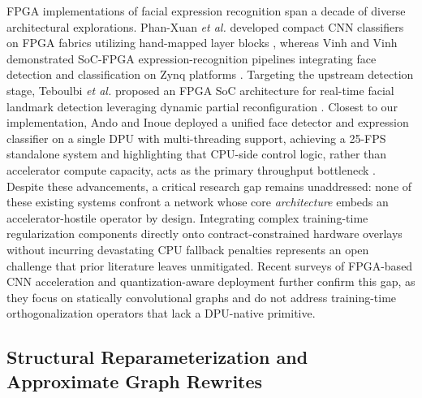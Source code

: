 \documentclass[algorithms,article,submit,moreauthors]{Definitions/mdpi}
\newcommand{\rev}[1]{\textcolor{revcolor}{#1}}
\begin{document}
FPGA implementations of facial expression recognition span a decade of diverse architectural explorations. Phan-Xuan \textit{et al.} developed compact CNN classifiers on FPGA fabrics utilizing hand-mapped layer blocks \citep{bib12}, whereas Vinh and Vinh demonstrated SoC-FPGA expression-recognition pipelines integrating face detection and classification on Zynq platforms \citep{bib13}. Targeting the upstream detection stage, Teboulbi \textit{et al.} proposed an FPGA SoC architecture for real-time facial landmark detection leveraging dynamic partial reconfiguration \citep{bib14}. Closest to our implementation, Ando and Inoue deployed a unified face detector and expression classifier on a single DPU with multi-threading support, achieving a 25-FPS standalone system and highlighting that CPU-side control logic, rather than accelerator compute capacity, acts as the primary throughput bottleneck \citep{bib15}. Despite these advancements, a critical research gap remains unaddressed: none of these existing systems confront a network whose core \emph{architecture} embeds an accelerator-hostile operator by design. Integrating complex training-time regularization components directly onto contract-constrained hardware overlays without incurring devastating CPU fallback penalties represents an open challenge that prior literature leaves unmitigated. \rev{Recent surveys of FPGA-based CNN acceleration and quantization-aware deployment further confirm this gap, as they focus on statically convolutional graphs and do not address training-time orthogonalization operators that lack a DPU-native primitive.}

\subsection{Structural Reparameterization and Approximate Graph Rewrites}
\end{document}
